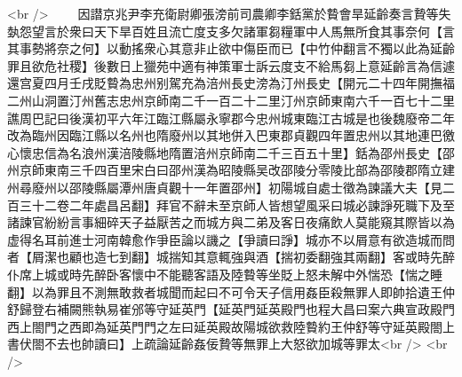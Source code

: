 <br />
　　因譛京兆尹李充衛尉卿張滂前司農卿李銛黨於䞇會旱延齡奏言贄等失埶怨望言於衆曰天下旱百姓且流亡度支多欠諸軍芻糧軍中人馬無所食其事奈何【言其事勢將奈之何】以動搖衆心其意非止欲中傷臣而已【中竹仲翻言不獨以此為延齡罪且欲危社稷】後數日上獵苑中適有神策軍士訴云度支不給馬芻上意延齡言為信遽還宫夏四月壬戌貶䞇為忠州别駕充為涪州長史滂為汀州長史【開元二十四年開撫福二州山洞置汀州舊志忠州京師南二千一百二十二里汀州京師東南六千一百七十二里譙周巴記曰後漢初平六年江臨江縣屬永寧郡今忠州城東臨江古城是也後魏廢帝二年改為臨州因臨江縣以名州也隋廢州以其地併入巴東郡貞觀四年置忠州以其地連巴徼心懷忠信為名浪州漢涪陵縣地隋置涪州京師南二千三百五十里】銛為邵州長史【邵州京師東南三千四百里宋白曰邵州漢為昭陵縣吴改邵陵分零陵比部為邵陵郡隋立建州尋廢州以邵陵縣屬潭州唐貞觀十一年置邵州】初陽城自處士徵為諫議大夫【見二百三十二卷二年處昌呂翻】拜官不辭未至京師人皆想望風采曰城必諫諍死職下及至諸諫官紛紛言事細碎天子益厭苦之而城方與二弟及客日夜痛飲人莫能窺其際皆以為虚得名耳前進士河南韓愈作爭臣論以譏之【爭讀曰諍】城亦不以屑意有欲造城而問者【屑潔也顧也造七到翻】城揣知其意輒強與酒【揣初委翻強其兩翻】客或時先醉仆席上城或時先醉卧客懷中不能聽客語及陸䞇等坐貶上怒未解中外惴恐【惴之睡翻】以為罪且不測無敢救者城聞而起曰不可令天子信用姦臣殺無罪人即帥拾遺王仲舒歸登右補闕熊執易崔邠等守延英門【延英門延英殿門也程大昌曰案六典宣政殿門西上閤門之西即為延英門門之左曰延英殿故陽城欲救陸䞇約王仲舒等守延英殿閤上書伏閤不去也帥讀曰】上疏論延齡姦佞贄等無罪上大怒欲加城等罪太<br />
<br />
